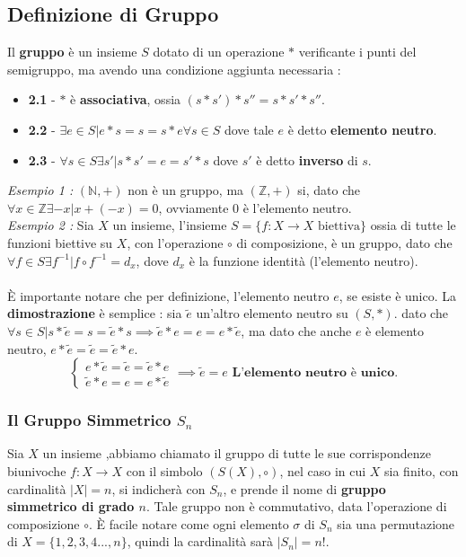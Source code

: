 \documentclass[12pt, letterpaper]{article}
\begin{document}
\subsection{Definizione di Gruppo}
Il \textbf{gruppo} è un insieme \(S\) dotato di un operazione \(*\) verificante i punti del semigruppo, ma avendo una 
condizione aggiunta necessaria :
\begin{itemize}
    \item \textbf{2.1} - \(*\) è \textbf{associativa}, ossia \((s*s')*s''=s*s'*s''\).
    \item \textbf{2.2} - \(\exists e \in S | e*s=s=s*e \forall s\in S\) dove tale \(e\) è detto \textbf{elemento neutro}.
    \item \textbf{2.3} - \( \forall s\in S \exists s' | s*s'=e=s'*s\) dove \(s'\) è detto \textbf{inverso} di \(s\).
\end{itemize}
\textit{Esempio 1 :} \((\mathbb{N},+)\) non è un gruppo, ma \((\mathbb{Z},+)\) si, dato che \(\forall x\in\mathbb{Z} 
\exists -x | x+(-x)=0\), ovviamente \(0\) è l'elemento neutro.\\
\textit{Esempio 2 :} Sia \(X\) un insieme, l'insieme \(S=\{f:X\rightarrow X \text{ biettiva}\}\) ossia di tutte 
le funzioni biettive su \(X\), con l'operazione \(\circ\) di composizione, è un gruppo, dato che 
\(\forall f \in S \exists f^{-1} | f\circ f^{-1} = d_x\), dove \(d_x\) è la funzione identità (l'elemento neutro).\\
\hphantom{.}\\È importante notare che per definizione, l'elemento neutro \(e\), se esiste è unico. La \textbf{dimostrazione}
è semplice : sia \(\tilde{e}\) un'altro elemento neutro su \((S,*)\). dato che \(\forall s\in S|s*\tilde{e}=s=\tilde{e}*s\implies 
\tilde{e}*e=e=e*\tilde{e}\), ma dato che anche \(e\) è elemento neutro, \(e*\tilde{e}=\tilde{e}=\tilde{e}*e\).\begin{equation}
    \begin{cases}
        e*\tilde{e}=\tilde{e}=\tilde{e}*e\\
        \tilde{e}*e=e=e*\tilde{e}
    \end{cases}
    \implies \tilde{e}=e \textbf{ L'elemento neutro è unico.}
\end{equation}
\subsubsection{Il Gruppo Simmetrico \(S_n\)}
Sia \(X\) un insieme ,abbiamo chiamato il gruppo di tutte le sue corrispondenze biunivoche
 \(f:X\rightarrow X\) con il simbolo \((S(X),\circ)\), nel caso in cui \(X\) sia finito, con cardinalità 
 \(|X|=n\), si indicherà con \(S_n\), e prende il nome di \textbf{gruppo simmetrico di grado \(n\)}. Tale gruppo 
 non è commutativo, data l'operazione di composizione \(\circ\). È facile notare come ogni elemento \(\sigma\) di 
 \(S_n\) sia una permutazione di \(X=\{1,2,3,4...,n\}\), quindi la cardinalità sarà \(|S_n|=n!\). \\
\end{document}
